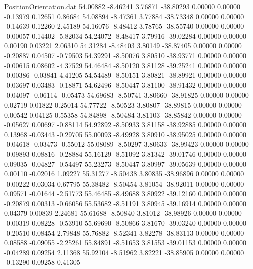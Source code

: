 \begin{filecontents}{PositionOrientation.dat}
  54.00882   -8.46241    3.76871   -38.80293    0.00000    0.00000   -0.13979    0.12651    0.86684
  54.08894   -8.47361    3.77884   -38.73348    0.00000    0.00000   -0.14639    0.12260    2.45189
  54.16076   -8.48412    3.78765   -38.55740    0.00000    0.00000   -0.00057    0.14402   -5.82034
  54.24072   -8.48417    3.79916   -39.02284    0.00000    0.00000    0.00190    0.03221    2.06310
  54.31284   -8.48403    3.80149   -38.87405    0.00000    0.00000   -0.20887    0.04507   -0.79503
  54.39291   -8.50076    3.80510   -38.93771    0.00000    0.00000   -0.00615    0.08602   -4.37529
  54.46484   -8.50120    3.81128   -39.25241    0.00000    0.00000   -0.00386   -0.03841    4.41205
  54.54489   -8.50151    3.80821   -38.89921    0.00000    0.00000   -0.03697    0.03483   -0.18871
  54.62496   -8.50447    3.81100   -38.91432    0.00000    0.00000   -0.04097   -0.06114   -0.05473
  54.69683   -8.50741    3.80660   -38.91825    0.00000    0.00000    0.02719    0.01822    0.25014
  54.77722   -8.50523    3.80807   -38.89815    0.00000    0.00000    0.00542    0.04125    0.55358
  54.84898   -8.50484    3.81103   -38.85842    0.00000    0.00000   -0.05627    0.00697   -0.88114
  54.92892   -8.50933    3.81158   -38.92885    0.00000    0.00000    0.13968   -0.03443   -0.29705
  55.00093   -8.49928    3.80910   -38.95025    0.00000    0.00000   -0.04618   -0.03473   -0.55012
  55.08089   -8.50297    3.80633   -38.99423    0.00000    0.00000   -0.09893    0.08816   -0.28884
  55.16129   -8.51092    3.81342   -39.01746    0.00000    0.00000    0.09035   -0.04827   -0.54497
  55.23273   -8.50447    3.80997   -39.05639    0.00000    0.00000    0.00110   -0.02016    1.09227
  55.31277   -8.50438    3.80835   -38.96896    0.00000    0.00000   -0.00222    0.03034    0.67795
  55.38482   -8.50454    3.81054   -38.92011    0.00000    0.00000    0.09571   -0.01644   -2.51773
  55.46485   -8.49688    3.80922   -39.12160    0.00000    0.00000   -0.20879    0.00313   -0.66056
  55.53682   -8.51191    3.80945   -39.16914    0.00000    0.00000    0.04379    0.00839    2.24681
  55.61688   -8.50840    3.81012   -38.98926    0.00000    0.00000   -0.00319    0.08228   -0.53910
  55.69690   -8.50866    3.81670   -39.03240    0.00000    0.00000   -0.20510    0.08454    2.79848
  55.76882   -8.52341    3.82278   -38.83113    0.00000    0.00000    0.08588   -0.09055   -2.25261
  55.84891   -8.51653    3.81553   -39.01153    0.00000    0.00000   -0.04289    0.09254    2.11368
  55.92104   -8.51962    3.82221   -38.85905    0.00000    0.00000   -0.13290    0.09258    0.41305

\end{filecontents}
